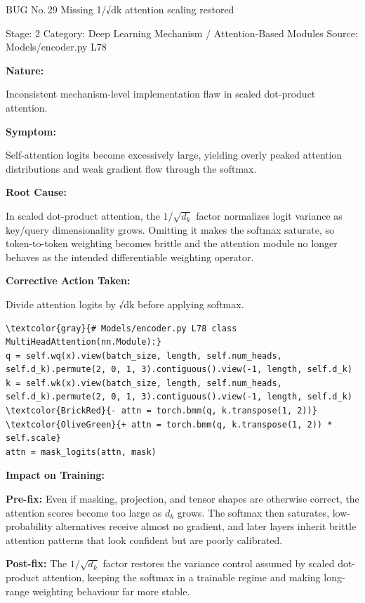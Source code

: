 \documentclass[10pt]{article}
\newcommand{\FieldLabel}[1]{%
 {\bfseries #1:}\par
}
\begin{document}
\begin{bugbox}{BUG No.\,29 \quad Missing 1/√dk attention scaling restored}
{\color{MetaGray}\small Stage: 2 \;\textbar\; Category: Deep Learning Mechanism / Attention-Based Modules \;\textbar\; Source: Models/encoder.py L78\par}
\vspace{0.22em}
\FieldLabel{Nature}
Inconsistent mechanism-level implementation flaw in scaled dot-product attention.
\par
\vspace{0.35em}
\FieldLabel{Symptom}
Self-attention logits become excessively large, yielding overly peaked attention distributions and weak gradient flow through the softmax.
\par
\vspace{0.35em}
\FieldLabel{Root Cause}
In scaled dot-product attention, the $1/\sqrt{d_k}$ factor normalizes logit variance as key/query dimensionality grows. Omitting it makes the softmax saturate, so token-to-token weighting becomes brittle and the attention module no longer behaves as the intended differentiable weighting operator.
\par
\vspace{0.35em}
\FieldLabel{Corrective Action Taken}
Divide attention logits by √dk before applying softmax.
\par
\vspace{0.35em}
\begin{Verbatim}[commandchars=\\\{\},fontsize=\footnotesize,breaklines=true,breaksymbol={},frame=leftline,framerule=2pt,rulecolor=\color{gray!40},xleftmargin=6pt,formatcom=\singlespacing]
\textcolor{gray}{# Models/encoder.py L78 class MultiHeadAttention(nn.Module):}
q = self.wq(x).view(batch_size, length, self.num_heads, self.d_k).permute(2, 0, 1, 3).contiguous().view(-1, length, self.d_k)
k = self.wk(x).view(batch_size, length, self.num_heads, self.d_k).permute(2, 0, 1, 3).contiguous().view(-1, length, self.d_k)
\textcolor{BrickRed}{- attn = torch.bmm(q, k.transpose(1, 2))}
\textcolor{OliveGreen}{+ attn = torch.bmm(q, k.transpose(1, 2)) * self.scale}
attn = mask_logits(attn, mask)
\end{Verbatim}
\vspace{0.22em}
\FieldLabel{Impact on Training}
\textbf{Pre-fix:} Even if masking, projection, and tensor shapes are otherwise correct, the attention scores become too large as \(d_k\) grows. The softmax then saturates, low-probability alternatives receive almost no gradient, and later layers inherit brittle attention patterns that look confident but are poorly calibrated.\par\smallskip
\textbf{Post-fix:} The \(1/\sqrt{d_k}\) factor restores the variance control assumed by scaled dot-product attention, keeping the softmax in a trainable regime and making long-range weighting behaviour far more stable.
\par
\vspace{0.35em}
\end{bugbox}
\end{document}
